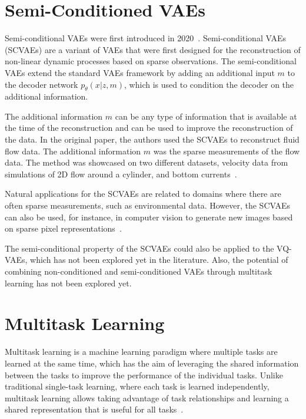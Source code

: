 \section{Semi-Conditioned VAEs}

Semi-conditional VAEs were first introduced in 2020~\cite{Gundersen_2021}. Semi-conditional VAEs (SCVAEs) are a variant of VAEs that were first designed for the reconstruction of non-linear dynamic processes based on sparse observations. The semi-conditional VAEs extend the standard VAEs framework by adding an additional input $m$ to the decoder network $p_{\theta}(x|z, m)$, which is used to condition the decoder on the additional information. 

The additional information $m$ can be any type of information that is available at the time of the reconstruction and can be used to improve the reconstruction of the data. In the original paper, the authors used the SCVAEs to reconstruct fluid flow data. The additional information $m$ was the sparse measurements of the flow data. The method was showcased on two different datasets, velocity data from simulations of 2D flow around a cylinder, and bottom currents~\cite{Gundersen_2021}.

Natural applications for the SCVAEs are related to domains where there are often sparse measurements, such as environmental data. However, the SCVAEs can also be used, for instance, in computer vision to generate new images based on sparse pixel representations~\cite{Gundersen_2021}.

The semi-conditional property of the SCVAEs could also be applied to the VQ-VAEs, which has not been explored yet in the literature. Also, the potential of combining non-conditioned and semi-conditioned VAEs through multitask learning has not been explored yet.

\section{Multitask Learning}

Multitask learning is a machine learning paradigm where multiple tasks are learned at the same time, which has the aim of leveraging the shared information between the tasks to improve the performance of the individual tasks. Unlike traditional single-task learning, where each task is learned independently, multitask learning allows taking advantage of task relationships and learning a shared representation that is useful for all tasks~\cite{multitasklearning}.

